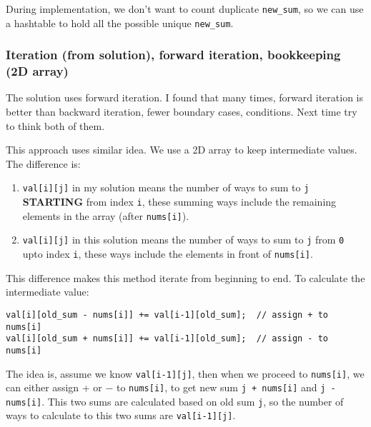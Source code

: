 \documentclass[11pt]{article}
\begin{document}
During implementation, we don't want to count duplicate \texttt{new\_sum}, so we can use a hashtable to hold all the possible unique \texttt{new\_sum}.




\subsubsection{Iteration (from solution), forward iteration, bookkeeping (2D array)}
\label{sec:org89d02b0}
The solution uses forward iteration. I found that many times, forward iteration is better than backward iteration, fewer boundary cases, conditions. Next time try to think both of them.

This approach uses similar idea. We use a 2D array to keep intermediate values. The difference is:
\begin{enumerate}
\item \texttt{val[i][j]} in my solution means the number of ways to sum to \texttt{j} \textbf{STARTING} from index \texttt{i}, these summing ways include the remaining elements in the array (after \texttt{nums[i]}).
\item \texttt{val[i][j]} in this solution means the number of ways to sum to \texttt{j} from \texttt{0} upto index \texttt{i}, these ways include the elements in front of \texttt{nums[i]}.
\end{enumerate}

This difference makes this method iterate from beginning to end. To calculate the intermediate value:
\begin{verbatim}
val[i][old_sum - nums[i]] += val[i-1][old_sum];  // assign + to nums[i]
val[i][old_sum + nums[i]] += val[i-1][old_sum];  // assign - to nums[i]
\end{verbatim}

The idea is, assume we know \texttt{val[i-1][j]}, then when we proceed to \texttt{nums[i]}, we can either assign + or − to \texttt{nums[i]}, to get new sum \texttt{j + nums[i]} and \texttt{j - nums[i]}. This two sums are calculated based on old sum \texttt{j}, so the number of ways to calculate to this two sums are \texttt{val[i-1][j]}.
\end{document}
